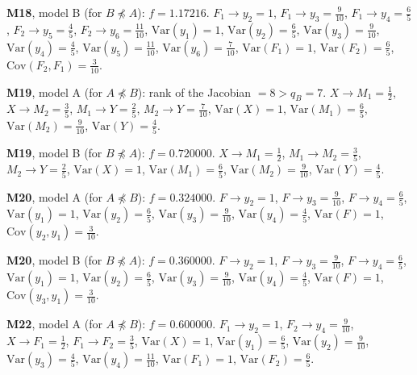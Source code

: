 \documentclass[10pt,a4paper]{article}
\newcommand{\nnest}{\not\preceq}
\begin{document}
{\noindent\textbf{M18}, model B (for $B\nnest A$): $f=1.17216$. {\footnotesize $F_{1}\to y_{2}=1$, $F_{1}\to y_{3}=\tfrac{9}{10}$, $F_{1}\to y_{4}=\tfrac{6}{5}$, $F_{2}\to y_{5}=\tfrac{4}{5}$, $F_{2}\to y_{6}=\tfrac{11}{10}$, $\mathrm{Var}(y_{1})=1$, $\mathrm{Var}(y_{2})=\tfrac{6}{5}$, $\mathrm{Var}(y_{3})=\tfrac{9}{10}$, $\mathrm{Var}(y_{4})=\tfrac{4}{5}$, $\mathrm{Var}(y_{5})=\tfrac{11}{10}$, $\mathrm{Var}(y_{6})=\tfrac{7}{10}$, $\mathrm{Var}(F_{1})=1$, $\mathrm{Var}(F_{2})=\tfrac{6}{5}$, $\mathrm{Cov}(F_{2},F_{1})=\tfrac{3}{10}$.}\par\smallskip
\noindent\textbf{M19}, model A (for $A\nnest B$): rank of the Jacobian $=8>q_B=7$. {\footnotesize $X\to M_{1}=\tfrac{1}{2}$, $X\to M_{2}=\tfrac{3}{5}$, $M_{1}\to Y=\tfrac{2}{5}$, $M_{2}\to Y=\tfrac{7}{10}$, $\mathrm{Var}(X)=1$, $\mathrm{Var}(M_{1})=\tfrac{6}{5}$, $\mathrm{Var}(M_{2})=\tfrac{9}{10}$, $\mathrm{Var}(Y)=\tfrac{4}{5}$.}\par\smallskip
\noindent\textbf{M19}, model B (for $B\nnest A$): $f=0.720000$. {\footnotesize $X\to M_{1}=\tfrac{1}{2}$, $M_{1}\to M_{2}=\tfrac{3}{5}$, $M_{2}\to Y=\tfrac{2}{5}$, $\mathrm{Var}(X)=1$, $\mathrm{Var}(M_{1})=\tfrac{6}{5}$, $\mathrm{Var}(M_{2})=\tfrac{9}{10}$, $\mathrm{Var}(Y)=\tfrac{4}{5}$.}\par\smallskip
\noindent\textbf{M20}, model A (for $A\nnest B$): $f=0.324000$. {\footnotesize $F\to y_{2}=1$, $F\to y_{3}=\tfrac{9}{10}$, $F\to y_{4}=\tfrac{6}{5}$, $\mathrm{Var}(y_{1})=1$, $\mathrm{Var}(y_{2})=\tfrac{6}{5}$, $\mathrm{Var}(y_{3})=\tfrac{9}{10}$, $\mathrm{Var}(y_{4})=\tfrac{4}{5}$, $\mathrm{Var}(F)=1$, $\mathrm{Cov}(y_{2},y_{1})=\tfrac{3}{10}$.}\par\smallskip
\noindent\textbf{M20}, model B (for $B\nnest A$): $f=0.360000$. {\footnotesize $F\to y_{2}=1$, $F\to y_{3}=\tfrac{9}{10}$, $F\to y_{4}=\tfrac{6}{5}$, $\mathrm{Var}(y_{1})=1$, $\mathrm{Var}(y_{2})=\tfrac{6}{5}$, $\mathrm{Var}(y_{3})=\tfrac{9}{10}$, $\mathrm{Var}(y_{4})=\tfrac{4}{5}$, $\mathrm{Var}(F)=1$, $\mathrm{Cov}(y_{3},y_{1})=\tfrac{3}{10}$.}\par\smallskip
\noindent\textbf{M22}, model A (for $A\nnest B$): $f=0.600000$. {\footnotesize $F_{1}\to y_{2}=1$, $F_{2}\to y_{4}=\tfrac{9}{10}$, $X\to F_{1}=\tfrac{1}{2}$, $F_{1}\to F_{2}=\tfrac{3}{5}$, $\mathrm{Var}(X)=1$, $\mathrm{Var}(y_{1})=\tfrac{6}{5}$, $\mathrm{Var}(y_{2})=\tfrac{9}{10}$, $\mathrm{Var}(y_{3})=\tfrac{4}{5}$, $\mathrm{Var}(y_{4})=\tfrac{11}{10}$, $\mathrm{Var}(F_{1})=1$, $\mathrm{Var}(F_{2})=\tfrac{6}{5}$.}\par\smallskip
}
\end{document}
